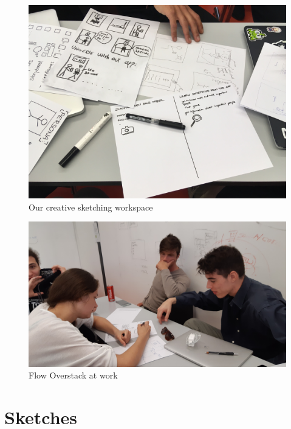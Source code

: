 \documentclass[12pt]{scrartcl}
\begin{document}
	
	\begin{figure}[H]
        		\centering
       		\includegraphics[width=\textwidth]{../images/group1.jpg}
       		\caption{Our creative sketching workspace}
        		\label{group1}
	\end{figure}
	
	\begin{figure}[H]
        		\centering
       		\includegraphics[width=\textwidth]{../images/group2.jpg}
       		\caption{Flow Overstack at work}
        		\label{group2}
	\end{figure}
	
	
\section{Sketches}
	
	
\end{document}
